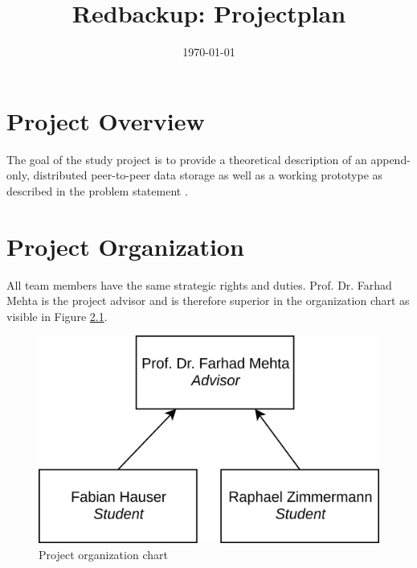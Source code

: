 

\usepackage{tabu}
\usepackage{rotating}
\usepackage{diagbox}
\usepackage{float}
\usepackage{multicol}
\usepackage{rotating}
\usepackage{url}

\title{Redbackup: Projectplan}

\date{\today}




\frontmatter

\maketitle


\tableofcontents %


\mainmatter
\chapter{Project Overview}
The goal of the study project is to provide a theoretical description of an append-only, distributed peer-to-peer data storage as well as a working prototype as described in the problem statement \cite{problemstatement}.


\chapter{Project Organization}

All team members have the same strategic rights and duties. Prof. Dr. Farhad Mehta is the project advisor and is therefore superior in the organization chart as visible in Figure \ref{fig:organigram}.

\begin{figure}[H]
	\centering
	\includegraphics[width=0.5\linewidth]{resources/organigram}
	\caption[Organigram]{Project organization chart}
	\label{fig:organigram}
\end{figure}

